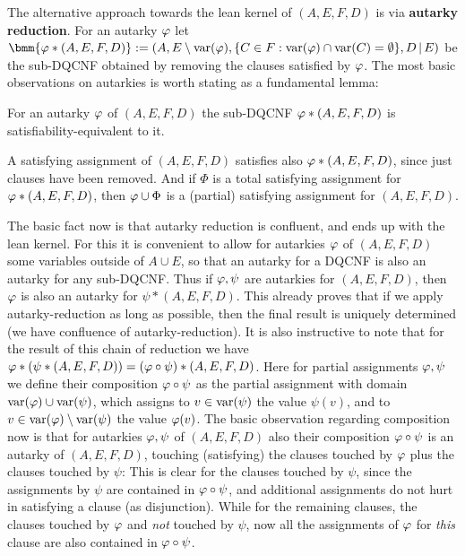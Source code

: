 \documentclass[conference]{IEEEtran}
\begin{document}
The alternative approach towards the lean kernel of $(A,E,F,D)$ is via \textbf{autarky reduction}. For an autarky $\varphi$ let $\bmm{\vp * (A,E,F,D)} := (A, E \sm \var(\vp), \set{C \in F : \var(\vp) \cap \var(C) = \es}, D \rstr E)$ be the sub-DQCNF obtained by removing the clauses satisfied by $\varphi$. The most basic observations on autarkies is worth stating as a fundamental lemma:\vspace{-1ex}
\begin{lem}\label{lem:autsateq}
  For an autarky $\varphi$ of $(A,E,F,D)$ the sub-DQCNF $\varphi * (A,E,F,D)$ is satisfiability-equivalent to it.
\end{lem}
\begin{prf}
A satisfying assignment of $(A,E,F,D)$ satisfies also $\varphi * (A,E,F,D)$, since just clauses have been removed. And if $\Phi$ is a total satisfying assignment for $\varphi * (A,E,F,D)$, then $\varphi \cup \Phi$ is a (partial) satisfying assignment for $(A,E,F,D)$. \Qed
\end{prf}
\vspace{-1ex}

The basic fact now is that autarky reduction is confluent, and ends up with the lean kernel.
For this it is convenient to allow for autarkies $\varphi$ of $(A,E,F,D)$ some variables outside of $A \cup E$, so that an autarky for a DQCNF is also an autarky for any sub-DQCNF.
Thus if $\varphi, \psi$ are autarkies for $(A,E,F,D)$, then $\varphi$ is also an autarky for $\psi * (A,E,F,D)$.
This already proves that if we apply autarky-reduction as long as possible, then the final result is uniquely determined (we have confluence of autarky-reduction).
It is also instructive to note that for the result of this chain of reduction we have $\varphi * (\psi * (A,E,F,D)) = (\varphi \circ \psi) * (A,E,F,D)$.
Here for partial assignments $\varphi, \psi$ we define their composition $\varphi \circ \psi$ as the partial assignment with domain $\operatorname{var}(\varphi) \cup \operatorname{var}(\psi)$, which assigns to $v \in \operatorname{var}(\psi)$ the value $\psi(v)$, and to $v \in \operatorname{var}(\varphi) \setminus \operatorname{var}(\psi)$ the value $\varphi(v)$.
The basic observation regarding composition now is that for autarkies $\varphi, \psi$ of $(A,E,F,D)$ also their composition $\varphi \circ \psi$ is an autarky of $(A,E,F,D)$, touching (satisfying) the clauses touched by $\varphi$ plus the clauses touched by $\psi$: This is clear for the clauses touched by $\psi$, since the assignments by $\psi$ are contained in $\varphi \circ \psi$, and additional assignments do not hurt in satisfying a clause (as disjunction).
While for the remaining clauses, the clauses touched by $\varphi$ and \emph{not} touched by $\psi$, now all the assignments of $\varphi$ for \emph{this} clause are also contained in $\varphi \circ \psi$.
\end{document}
